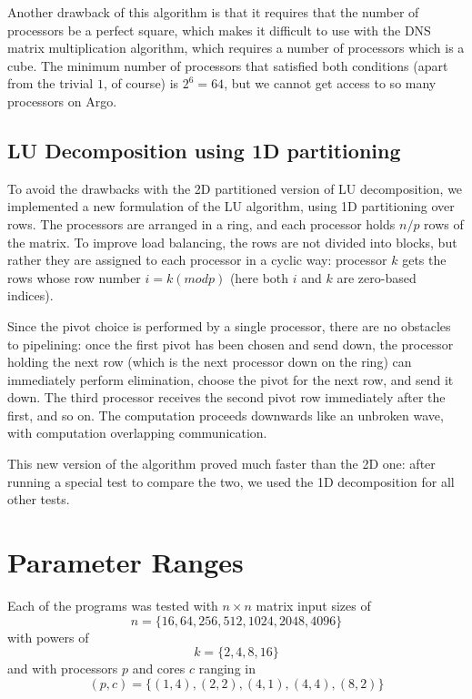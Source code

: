 \documentclass{article}
\begin{document}
Another drawback of this algorithm is that it requires that the number of processors be a perfect square, which makes it difficult to use with the DNS matrix multiplication algorithm, which requires a number of processors which is a cube. The minimum number of processors that satisfied both conditions (apart from the trivial $1$, of course) is $2^6 = 64$, but we cannot get access to so many processors on Argo.

\subsection{LU Decomposition using 1D partitioning}

To avoid the drawbacks with the 2D partitioned version of LU decomposition, we implemented a new formulation of the LU algorithm, using 1D partitioning over rows. The processors are arranged in a ring, and each processor holds $n/p$ rows of the matrix. To improve load balancing, the rows are not divided into blocks, but rather they are assigned to each processor in a cyclic way: processor $k$ gets the rows whose row number $i = k (mod p)$ (here both $i$ and $k$ are zero-based indices).


Since the pivot choice is performed by a single processor, there are no obstacles to pipelining: once the first pivot has been chosen and send down, the processor holding the next row (which is the next processor down on the ring) can immediately perform elimination, choose the pivot for the next row, and send it down. The third processor receives the second pivot row immediately after the first, and so on. The computation proceeds downwards like an unbroken wave, with computation overlapping communication.

This new version of the algorithm proved much faster than the 2D one: after running a special test to compare the two, we used the 1D decomposition for all other tests.

\section{Parameter Ranges}

Each of the programs was tested with $n \times n$ matrix input sizes of $$n =
\{ 16, 64, 256, 512, 1024, 2048, 4096 \}$$ with powers of $$k=\{ 2, 4, 8,
16 \}$$ and with processors $p$ and cores $c$ ranging in $$(p,c) = \{ (1,4),
(2,2), (4,1), (4,4), (8,2) \}$$
\end{document}
